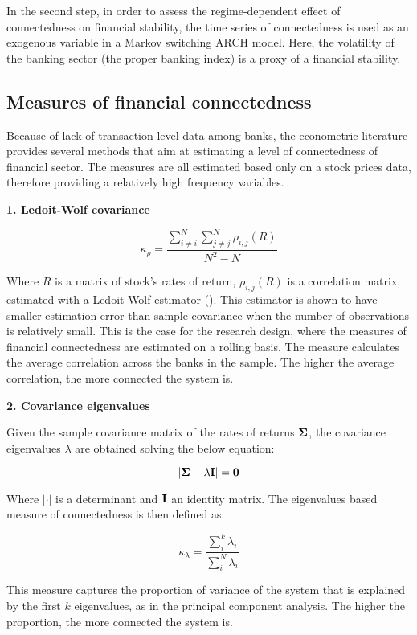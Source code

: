 \documentclass{article}
\begin{document}
In the second step, in order to assess the regime-dependent effect of connectedness on financial stability, the time series of connectedness is used as an exogenous variable in a Markov switching ARCH model. Here, the volatility of the banking sector (the proper banking index) is a proxy of a financial stability.

\subsection*{Measures of financial connectedness}

Because of lack of transaction-level data among banks, the econometric literature provides several methods that aim at estimating a level of connectedness of financial sector. The measures are all estimated based only on a stock prices data, therefore providing a relatively high frequency variables. 
\

\textbf{1. Ledoit-Wolf covariance} 

\[\kappa_{\rho} = \frac{\sum_{i \neq i}^{N} \sum_{j \neq j}^{N} \rho_{i,j}(R)}{N^2-N}\]

Where $R$ is a matrix of stock's rates of return, $\rho_{i,j}(R)$ is a correlation matrix, estimated with a Ledoit-Wolf estimator (\citet{ledoit}). This estimator is shown to have smaller estimation error than sample covariance when the number of observations is relatively small. This is the case for the research design, where the measures of financial connectedness are estimated on a rolling basis. The measure calculates the average correlation across the banks in the sample. The higher the average correlation, the more connected the system is.
\

\textbf{2. Covariance eigenvalues}

Given the sample covariance matrix of the rates of returns $\bf{\Sigma}$, the covariance eigenvalues $\lambda$ are obtained solving the below equation:

\[|\bf{\Sigma} - \lambda \bf{I}| = 0\]

Where $|\cdot|$ is a determinant and $\bf{I}$ an identity matrix. The eigenvalues based measure of connectedness is then defined as:

\[\kappa_{\lambda} = \frac{\sum_{i}^{k} \lambda_i}{\sum_{i}^{N} \lambda_i}\]

This measure captures the proportion of variance of the system that is explained by the first $k$ eigenvalues, as in the principal component analysis. The higher the proportion, the more connected the system is.
\end{document}
